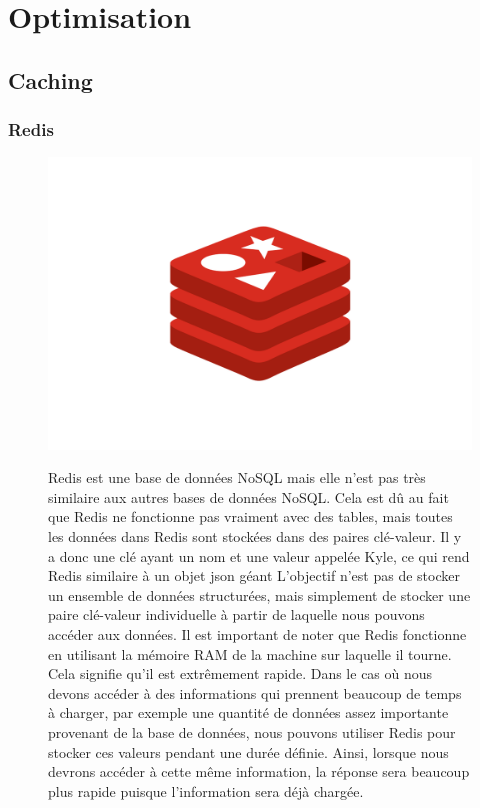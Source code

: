 \section{Optimisation}
\subsection{Caching}
\subsubsection{Redis}
\begin{figure}[H]
    \begin{minipage}{.3\textwidth}
      \includegraphics[width=1\linewidth]{img/redis.png}
    \end{minipage}
    \begin{minipage}{.7\textwidth}
Redis est une base de données NoSQL mais elle n'est pas très similaire aux autres bases de données NoSQL. Cela est dû au fait que Redis ne fonctionne pas vraiment avec des tables, mais toutes les données dans Redis sont stockées dans des paires clé-valeur. 
Il y a donc une clé ayant un nom et une valeur appelée Kyle, ce qui rend Redis similaire à un objet json géant
L'objectif n'est pas de stocker un ensemble de données structurées, mais simplement de stocker une paire clé-valeur individuelle à partir de laquelle nous pouvons accéder aux données.
Il est important de noter que Redis fonctionne en utilisant la mémoire RAM de la machine sur laquelle il tourne. Cela signifie qu'il est extrêmement rapide.
\newpara
Dans le cas où nous devons accéder à des informations qui prennent beaucoup de temps à charger, par exemple une quantité de données assez importante provenant de la base de données, nous pouvons utiliser Redis pour stocker ces valeurs pendant une durée définie. Ainsi, lorsque nous devrons accéder à cette même information, la réponse sera beaucoup plus rapide puisque l'information sera déjà chargée.
\end{minipage}
\end{figure}
